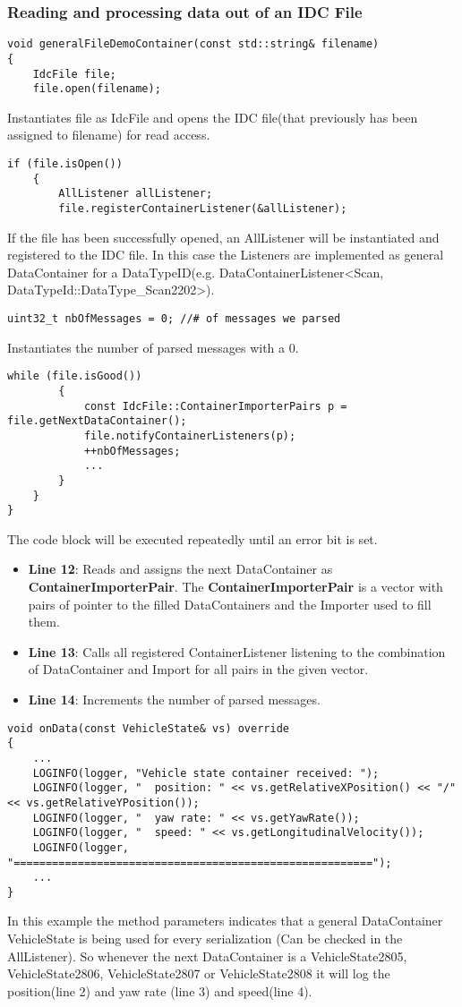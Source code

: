 \subsubsection{Reading and processing data out of an IDC File}
\begin{lstlisting}
void generalFileDemoContainer(const std::string& filename)
{
    IdcFile file;
    file.open(filename);
\end{lstlisting}
Instantiates file as IdcFile and opens the IDC file(that previously has been assigned to filename) for read access. 
\begin{lstlisting}[firstnumber=last]
    if (file.isOpen())
    {
    	AllListener allListener;
    	file.registerContainerListener(&allListener);
\end{lstlisting}
If the file has been successfully opened, an AllListener will be instantiated and registered to the IDC file. In this case the Listeners are implemented as general DataContainer for a DataTypeID(e.g. DataContainerListener<Scan, DataTypeId::DataType\_Scan2202>).
\begin{lstlisting}[firstnumber=last]
    	uint32_t nbOfMessages = 0; //# of messages we parsed
\end{lstlisting}
Instantiates the number of parsed messages with a 0.
\begin{lstlisting}[firstnumber=last]
    	while (file.isGood())
    	{
    		const IdcFile::ContainerImporterPairs p = file.getNextDataContainer();
      	  	file.notifyContainerListeners(p);
	    	++nbOfMessages;
	    	...
	    }
	}
}
\end{lstlisting}
The code block will be executed repeatedly until an error bit is set.
\begin{itemize}
	\item \textbf{Line 12}: Reads and assigns the next DataContainer as \textbf{ContainerImporterPair}. The \textbf{ContainerImporterPair} is a vector with pairs of pointer to the filled DataContainers and the Importer used to fill them.
	\item \textbf{Line 13}: Calls all registered ContainerListener listening to the combination of DataContainer and Import for all pairs in the given vector.
	\item \textbf{Line 14}: Increments the number of parsed messages. 
\end{itemize}
\newpage
\begin{lstlisting}
void onData(const VehicleState& vs) override
{
    ...
    LOGINFO(logger, "Vehicle state container received: ");
    LOGINFO(logger, "  position: " << vs.getRelativeXPosition() << "/" << vs.getRelativeYPosition());
    LOGINFO(logger, "  yaw rate: " << vs.getYawRate());
    LOGINFO(logger, "  speed: " << vs.getLongitudinalVelocity());
    LOGINFO(logger, "========================================================");
    ...
}
\end{lstlisting}
In this example the method parameters indicates that a general DataContainer VehicleState is being used for every serialization (Can be checked in the AllListener). So whenever the next DataContainer is a VehicleState2805, VehicleState2806, VehicleState2807 or VehicleState2808 it will log the position(line 2) and yaw rate (line 3) and speed(line 4).
\newpage
